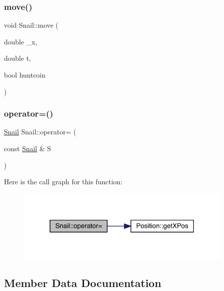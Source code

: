 \mbox{\label{class_snail_a7db73c2ca4146c04e7e37e444c15b08d}} 
\subsubsection{\texorpdfstring{move()}{move()}}
{\footnotesize\ttfamily void Snail\+::move (\begin{DoxyParamCaption}\item[{double}]{\+\_\+x,  }\item[{double}]{t,  }\item[{bool}]{huntcoin }\end{DoxyParamCaption})}

\mbox{\label{class_snail_a107c53b3f7917e1b31134bf6064af32c}} 
\subsubsection{\texorpdfstring{operator=()}{operator=()}}
{\footnotesize\ttfamily \mbox{\hyperlink{class_snail}{Snail}} Snail\+::operator= (\begin{DoxyParamCaption}\item[{const \mbox{\hyperlink{class_snail}{Snail}} \&}]{S }\end{DoxyParamCaption})}

Here is the call graph for this function\+:
\nopagebreak
\begin{figure}[H]
\begin{center}
\leavevmode
\includegraphics[width=298pt]{class_snail_a107c53b3f7917e1b31134bf6064af32c_cgraph}
\end{center}
\end{figure}


\subsection{Member Data Documentation}
\mbox{\label{class_snail_aa0ebca6e0094ccfac4909f8f47323e2d}} 
